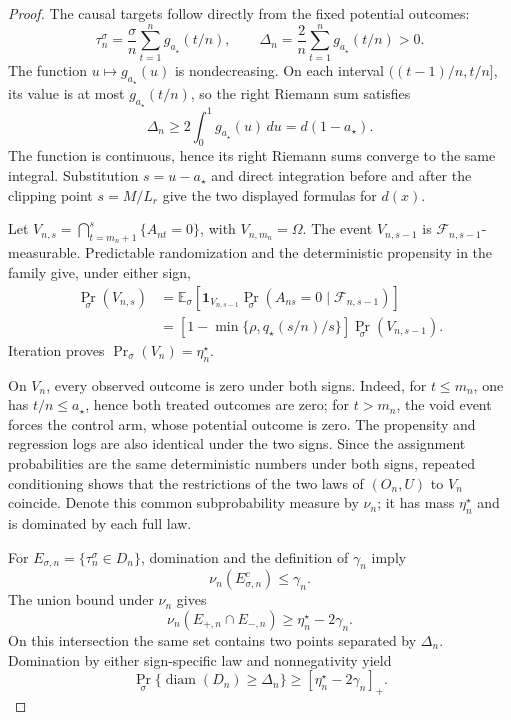 \documentclass{article}
\begin{document}
\begin{proof}
The causal targets follow directly from the fixed potential outcomes:
\[
 \tau_n^\sigma=\frac{\sigma}{n}\sum_{t=1}^n g_{a_\star}(t/n),
 \qquad
 \Delta_n=\frac2n\sum_{t=1}^n g_{a_\star}(t/n)>0.
\]
The function \(u\mapsto g_{a_\star}(u)\) is nondecreasing. On each interval \(((t-1)/n,t/n]\), its value is at most \(g_{a_\star}(t/n)\), so the right Riemann sum satisfies
\[
 \Delta_n\ge2\int_0^1g_{a_\star}(u)\,du=d(1-a_\star).
\]
The function is continuous, hence its right Riemann sums converge to the same integral. Substitution \(s=u-a_\star\) and direct integration before and after the clipping point \(s=M/L_r\) give the two displayed formulas for \(d(x)\).

Let \(V_{n,s}=\bigcap_{t=m_n+1}^{s}\{A_{nt}=0\}\), with \(V_{n,m_n}=\Omega\). The event \(V_{n,s-1}\) is \(\mathcal F_{n,s-1}\)-measurable. Predictable randomization and the deterministic propensity in the family give, under either sign,
\[
 \begin{aligned}
 \Pr_\sigma(V_{n,s})
 &=\mathbb E_\sigma\!\left[
 \mathbf1_{V_{n,s-1}}
 \Pr_\sigma(A_{ns}=0\mid\mathcal F_{n,s-1})
 \right]\\
 &=\left[1-\min\{\rho,q_\star(s/n)/s\}\right]
 \Pr_\sigma(V_{n,s-1}).
 \end{aligned}
\]
Iteration proves \(\Pr_\sigma(V_n)=\eta_n^\star\).

On \(V_n\), every observed outcome is zero under both signs. Indeed, for \(t\le m_n\), one has \(t/n\le a_\star\), hence both treated outcomes are zero; for \(t>m_n\), the void event forces the control arm, whose potential outcome is zero. The propensity and regression logs are also identical under the two signs. Since the assignment probabilities are the same deterministic numbers under both signs, repeated conditioning shows that the restrictions of the two laws of \((O_n,U)\) to \(V_n\) coincide. Denote this common subprobability measure by \(\nu_n\); it has mass \(\eta_n^\star\) and is dominated by each full law.

For \(E_{\sigma,n}=\{\tau_n^\sigma\in D_n\}\), domination and the definition of \(\gamma_n\) imply
\[
 \nu_n(E_{\sigma,n}^c)\le\gamma_n.
\]
The union bound under \(\nu_n\) gives
\[
 \nu_n(E_{+,n}\cap E_{-,n})\ge\eta_n^\star-2\gamma_n.
\]
On this intersection the same set contains two points separated by \(\Delta_n\). Domination by either sign-specific law and nonnegativity yield
\[
 \Pr_\sigma\{\operatorname{diam}(D_n)\ge\Delta_n\}
 \ge[\eta_n^\star-2\gamma_n]_+.
\]


\end{proof}
\end{document}
